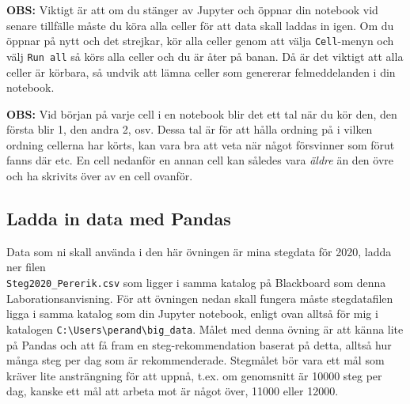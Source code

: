 \documentclass{article}
\begin{document}
\textbf{OBS:} Viktigt är att om du stänger av Jupyter och öppnar din notebook vid senare tillfälle måste du köra alla celler för att data skall laddas in igen. Om du öppnar på nytt och det strejkar, kör alla celler genom att välja \verb+Cell+-menyn och välj \verb+Run all+ så körs alla celler och du är åter på banan. Då är det viktigt att alla celler är körbara, så undvik att lämna celler som genererar felmeddelanden i din notebook.

\textbf{OBS:} Vid början på varje cell i en notebook blir det ett tal när du kör den, den första blir 1, den andra 2, osv. Dessa tal är för att hålla ordning på i vilken ordning cellerna har körts, kan vara bra att veta när något försvinner som förut fanns där etc. En cell nedanför en annan cell kan således vara \emph{äldre} än den övre och ha skrivits över av en cell ovanför.

\subsection{Ladda in data med Pandas}
Data som ni skall använda i den här övningen är mina stegdata för 2020, ladda ner filen\\ \verb+Steg2020_Pererik.csv+ som ligger i samma katalog på Blackboard som denna Laborationsanvisning. För att övningen nedan skall fungera måste stegdatafilen ligga i samma katalog som din Jupyter notebook, enligt ovan alltså för mig i katalogen \verb+C:\Users\perand\big_data+. Målet med denna övning är att känna lite på Pandas och att få fram en steg-rekommendation baserat på detta, alltså hur många steg  per dag som är rekommenderade. Stegmålet bör vara ett mål som kräver lite ansträngning för att uppnå, t.ex. om genomsnitt är 10000 steg per dag, kanske ett mål att arbeta mot är något över, 11000 eller 12000. 
\end{document}
